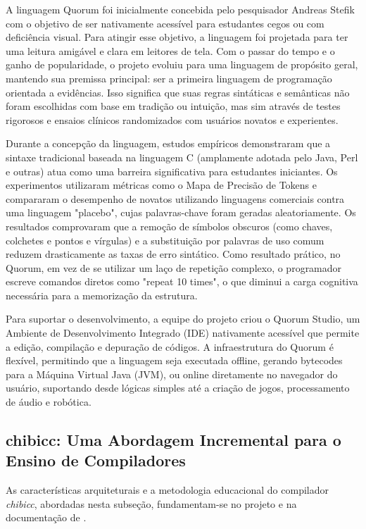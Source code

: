 A linguagem Quorum foi inicialmente concebida pelo pesquisador Andreas Stefik com o objetivo de ser nativamente acessível para estudantes cegos ou com deficiência visual. Para atingir esse objetivo, a linguagem foi projetada para ter uma leitura amigável e clara em leitores de tela. Com o passar do tempo e o ganho de popularidade, o projeto evoluiu para uma linguagem de propósito geral, mantendo sua premissa principal: ser a primeira linguagem de programação orientada a evidências. Isso significa que suas regras sintáticas e semânticas não foram escolhidas com base em tradição ou intuição, mas sim através de testes rigorosos e ensaios clínicos randomizados com usuários novatos e experientes.

Durante a concepção da linguagem, estudos empíricos demonstraram que a sintaxe tradicional baseada na linguagem C (amplamente adotada pelo Java, Perl e outras) atua como uma barreira significativa para estudantes iniciantes. Os experimentos utilizaram métricas como o Mapa de Precisão de Tokens e compararam o desempenho de novatos utilizando linguagens comerciais contra uma linguagem "placebo", cujas palavras-chave foram geradas aleatoriamente. Os resultados comprovaram que a remoção de símbolos obscuros (como chaves, colchetes e pontos e vírgulas) e a substituição por palavras de uso comum reduzem drasticamente as taxas de erro sintático. Como resultado prático, no Quorum, em vez de se utilizar um laço de repetição complexo, o programador escreve comandos diretos como "repeat 10 times", o que diminui a carga cognitiva necessária para a memorização da estrutura.

Para suportar o desenvolvimento, a equipe do projeto criou o Quorum Studio, um Ambiente de Desenvolvimento Integrado (IDE) nativamente acessível que permite a edição, compilação e depuração de códigos. A infraestrutura do Quorum é flexível, permitindo que a linguagem seja executada offline, gerando bytecodes para a Máquina Virtual Java (JVM), ou online diretamente no navegador do usuário, suportando desde lógicas simples até a criação de jogos, processamento de áudio e robótica.


\subsection{chibicc: Uma Abordagem Incremental para o Ensino de Compiladores}

As características arquiteturais e a metodologia educacional do compilador \textit{chibicc}, abordadas nesta subseção, fundamentam-se no projeto e na documentação de .

